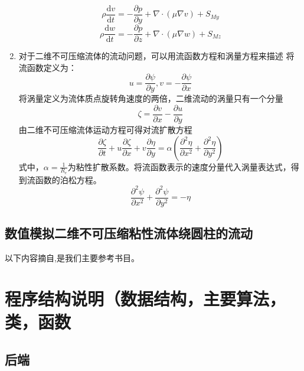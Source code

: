 \documentclass[12pt]{article}
\newcommand{\ud}{\mathrm{d}}
\begin{document}
\begin{enumerate}
\begin{equation}
\rho \frac{\ud v}{\ud t}=-\frac{\partial p}{\partial y}+\nabla\cdot(\mu\nabla v)+S_{My}
\end{equation}
\begin{equation}
\rho \frac{\ud w}{\ud t}=-\frac{\partial p}{\partial z}+\nabla\cdot(\mu\nabla w)+S_{Mz}
\end{equation}
\item 对于二维不可压缩流体的流动问题，可以用流函数方程和涡量方程来描述
将流函数定义为：
\begin{displaymath}
u=\frac{\partial\psi}{\partial y},v=-\frac{\partial\psi}{\partial x}
\end{displaymath}
将涡量定义为流体质点旋转角速度的两倍，二维流动的涡量只有一个分量
\begin{displaymath}
\zeta=\frac{\partial v}{\partial x}-\frac{\partial u}{\partial y}
\end{displaymath}
由二维不可压缩流体运动方程可得对流扩散方程
\begin{equation}
\frac{\partial\zeta}{\partial t}+u\frac{\partial\zeta}{\partial x}+v\frac{\partial \eta}{\partial y}=\alpha(\frac{\partial^{2}\eta}{\partial x^{2}}+\frac{\partial^{2}\eta}{\partial y^{2}})
\end{equation}
式中，$\alpha=\frac{1}{R_{e}}$为粘性扩散系数。将流函数表示的速度分量代入涡量表达式，得到流函数的泊松方程。
\begin{equation}
\frac{\partial^{2}\psi}{\partial x^{2}}+\frac{\partial^{2}\psi}{\partial y^{2}}=-\eta
\end{equation}
\end{enumerate}
\subsection{数值模拟二维不可压缩粘性流体绕圆柱的流动}
以下内容摘自\cite{cfd},是我们主要参考书目。
\newpage
{}
\section{程序结构说明（数据结构，主要算法，类，函数}
\subsection{后端}
\end{document}
